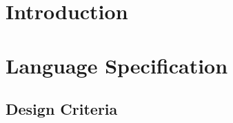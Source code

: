 


\frontmatter %
\newcommand{\ind}[1]{}

\ind{FormaliaForside}
\cleardoublepage %

\ind{FormaliaTitelblad}
\cleardoublepage
\ind{FormaliaProlog.tex}
\\\\
\ind{FormaliaUnderskriftsside.tex}
\cleardoublepage



\setlength\parskip{0ex} %
\tableofcontents* %
\setlength{\parskip}{3mm} %



\label{marker}
\mainmatter

\pagestyle{custom}

\renewcommand{\ind}[1]{}
\chapter{Introduction}
\label{chap:intro}
\ind{Introduction}
\ind{EnviromentForThisProject}
\ind{SolutionInBars}
\ind{ProblemStatement}
\ind{ReportStructure}

\renewcommand{\ind}[1]{}
\chapter{Language Specification}
\label{chap:lanspec}
\ind{LanguageSpecificationIntro}
\ind{ParadigmsOfProgrammingLanguage}
\section{Design Criteria}
\label{sec:designcriteria}
\ind{DesignCriteriaIntro}
\ind{ProgrammingAnArduino-basedDrinks-machine}
\ind{DesignCriteriaInThisProject}
